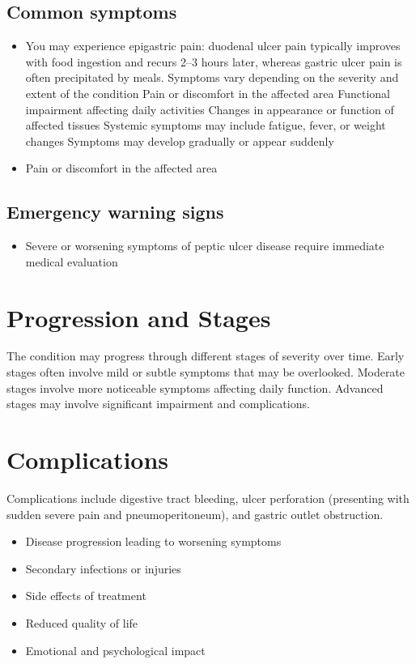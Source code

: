 \subsection{Common symptoms}
\begin{itemize}[noitemsep]
  \item You may experience epigastric pain: duodenal ulcer pain typically improves with food ingestion and recurs 2--3 hours later, whereas gastric ulcer pain is often precipitated by meals. Symptoms vary depending on the severity and extent of the condition Pain or discomfort in the affected area Functional impairment affecting daily activities Changes in appearance or function of affected tissues Systemic symptoms may include fatigue, fever, or weight changes Symptoms may develop gradually or appear suddenly
  \item Pain or discomfort in the affected area
  \end{itemize}

\subsection{Emergency warning signs}
\begin{itemize}[noitemsep]
  \item Severe or worsening symptoms of peptic ulcer disease require immediate medical evaluation
\end{itemize}
\section{Progression and Stages}
The condition may progress through different stages of severity over time. Early stages often involve mild or subtle symptoms that may be overlooked. Moderate stages involve more noticeable symptoms affecting daily function. Advanced stages may involve significant impairment and complications.
\section{Complications}
Complications include digestive tract bleeding, ulcer perforation (presenting with sudden severe pain and pneumoperitoneum), and gastric outlet obstruction.

\begin{itemize}[noitemsep]
  \item Disease progression leading to worsening symptoms
  \item Secondary infections or injuries
  \item Side effects of treatment
  \item Reduced quality of life
  \item Emotional and psychological impact
\end{itemize}
